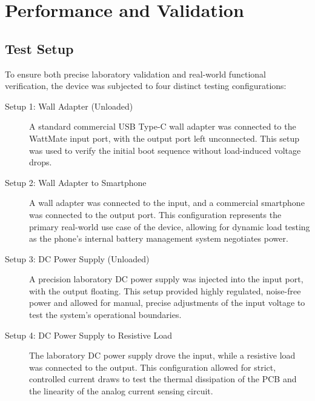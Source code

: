 \chapter{Performance and Validation}

\section{Test Setup}
To ensure both precise laboratory validation and real-world functional verification, the device was subjected to four distinct testing configurations:

\begin{description}
    \item[Setup 1: Wall Adapter (Unloaded)] A standard commercial USB Type-C wall adapter was connected to the WattMate input port, with the output port left unconnected. This setup was used to verify the initial boot sequence without load-induced voltage drops.
    
    \item[Setup 2: Wall Adapter to Smartphone] A wall adapter was connected to the input, and a commercial smartphone was connected to the output port. This configuration represents the primary real-world use case of the device, allowing for dynamic load testing as the phone's internal battery management system negotiates power.
    
    \item[Setup 3: DC Power Supply (Unloaded)] A precision laboratory DC power supply was injected into the input port, with the output floating. This setup provided highly regulated, noise-free power and allowed for manual, precise adjustments of the input voltage to test the system's operational boundaries.
    
    \item[Setup 4: DC Power Supply to Resistive Load] The laboratory DC power supply drove the input, while a resistive load was connected to the output. This configuration allowed for strict, controlled current draws to test the thermal dissipation of the PCB and the linearity of the analog current sensing circuit.
\end{description}




